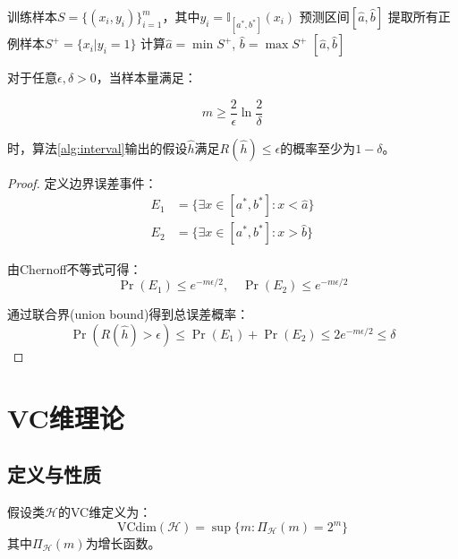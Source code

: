 \documentclass{article}
\begin{document}
\begin{algorithm}[t]
\caption{区间ERM算法}
\label{alg:interval}
\begin{algorithmic}[1]
\Require 训练样本$S = \{(x_i,y_i)\}_{i=1}^m$，其中$y_i = \mathbb{I}_{[a^*,b^*]}(x_i)$
\Ensure 预测区间$[\hat{a},\hat{b}]$
\State 提取所有正例样本$S^+ = \{x_i | y_i = 1\}$
\State 计算$\hat{a} = \min S^+$, $\hat{b} = \max S^+$
\State \Return $[\hat{a},\hat{b}]$
\end{algorithmic}
\end{algorithm}

\begin{theorem}
\label{thm:interval}
对于任意$\epsilon,\delta > 0$，当样本量满足：

\begin{equation}
m \geq \frac{2}{\epsilon}\ln\frac{2}{\delta}
\end{equation}

时，算法\ref{alg:interval}输出的假设$\hat{h}$满足$R(\hat{h}) \leq \epsilon$的概率至少为$1-\delta$。
\end{theorem}

\begin{proof}
定义边界误差事件：
\begin{align*}
E_1 &= \{\exists x \in [a^*,b^*]: x < \hat{a}\} \\
E_2 &= \{\exists x \in [a^*,b^*]: x > \hat{b}\}
\end{align*}

由Chernoff不等式可得：
\begin{equation}
\Pr(E_1) \leq e^{-m\epsilon/2}, \quad \Pr(E_2) \leq e^{-m\epsilon/2}
\end{equation}

通过联合界(union bound)得到总误差概率：
\begin{equation}
\Pr(R(\hat{h}) > \epsilon) \leq \Pr(E_1) + \Pr(E_2) \leq 2e^{-m\epsilon/2} \leq \delta
\end{equation}
\end{proof}

\section{VC维理论}
\label{sec:vc}

\subsection{定义与性质}
\begin{definition}[VC维]
假设类$\mathcal{H}$的VC维定义为：
\begin{equation}
\text{VCdim}(\mathcal{H}) = \sup\{m: \Pi_\mathcal{H}(m) = 2^m\}
\end{equation}
其中$\Pi_\mathcal{H}(m)$为增长函数。
\end{definition}
\end{document}
